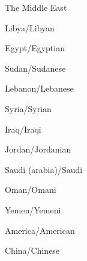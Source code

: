 

\begin{flashcard}{\LARGE The Middle East}
\LARGE {}
\end{flashcard}
\begin{flashcard}{\LARGE Libya/Libyan}
\LARGE {}
\end{flashcard}
\begin{flashcard}{\LARGE Egypt/Egyptian}
\LARGE {}
\end{flashcard}
\begin{flashcard}{\LARGE Sudan/Sudanese}
\LARGE {}
\end{flashcard}
\begin{flashcard}{\LARGE Lebanon/Lebanese}
\LARGE {}
\end{flashcard}
\begin{flashcard}{\LARGE Syria/Syrian}
\LARGE {}
\end{flashcard}
\begin{flashcard}{\LARGE Iraq/Iraqi}
\LARGE {}
\end{flashcard}
\begin{flashcard}{\LARGE Jordan/Jordanian}
\LARGE {}
\end{flashcard}
\begin{flashcard}{\LARGE Saudi (arabia)/Saudi}
\LARGE {}
\end{flashcard}
\begin{flashcard}{\LARGE Oman/Omani}
\LARGE {}
\end{flashcard}
\begin{flashcard}{\LARGE Yemen/Yemeni}
\LARGE {}
\end{flashcard}
\begin{flashcard}{\LARGE America/American}
\LARGE {}
\end{flashcard}
\begin{flashcard}{\LARGE China/Chinese}
\LARGE {}
\end{flashcard}
